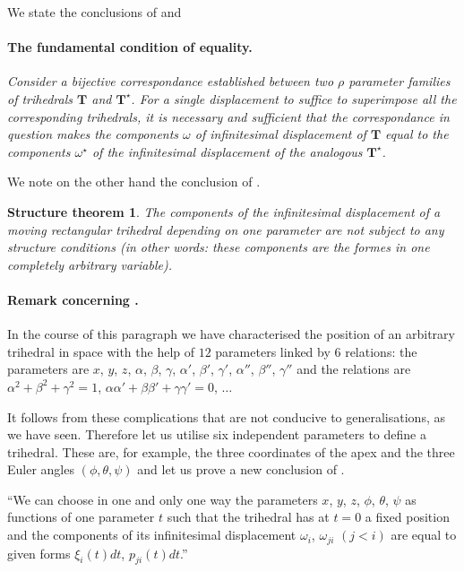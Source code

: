 We state the conclusions of  and 

\paragraph{The fundamental condition of equality.}
\label{sec:7}
\emph{Consider a bijective correspondance established between two $\rho$ parameter families of trihedrals $\mathbf{T}$ and $\mathbf{T}^{\star}$. For a single displacement to suffice to superimpose all the corresponding trihedrals, it is necessary and sufficient that the correspondance in question makes the components $\omega$ of infinitesimal displacement of $\mathbf{T}$ equal to the components $\omega^{\star}$ of the infinitesimal displacement of the analogous $\mathbf{T}^{\star}$.}

We note on the other hand the conclusion of .

\theoremstyle{shape1}
\newtheorem*{strthm}{Structure theorem}
\begin{strthm}
  The components of the infinitesimal displacement of a moving rectangular trihedral depending on one parameter are not subject to any structure conditions \emph{(in other words: these components are the formes in one completely arbitrary variable)}.
\end{strthm}

\paragraph{Remark concerning .}
\label{sec:8}
In the course of this paragraph we have characterised the position of an arbitrary trihedral in space with the help of $12$ parameters linked by $6$ relations: the parameters are $x$, $y$, $z$, $\alpha$, $\beta$, $\gamma$, $\alpha'$, $\beta'$, $\gamma'$, $\alpha''$, $\beta''$, $\gamma''$ and the relations are $\alpha^{2}+\beta^{2}+\gamma^{2}=1$, $\alpha\alpha'+\beta\beta'+\gamma\gamma'=0$, $\dots$

It follows from these complications that are not conducive to generalisations, as we have seen. Therefore let us utilise six independent parameters to define a trihedral. These are, for example, the three coordinates of the apex and the three Euler angles $(\phi, \theta, \psi)$ and let us prove a new conclusion of .

``We can choose in one and only one way the parameters $x$, $y$, $z$, $\phi$, $\theta$, $\psi$ as functions of one parameter $t$ such that the trihedral has at $t=0$ a fixed position and the components of its infinitesimal displacement $\omega_{i}$, $\omega_{ji}$ $(j<i)$ are equal to given forms $\xi_{i}(t)dt$, $p_{ji}(t)dt$.''

